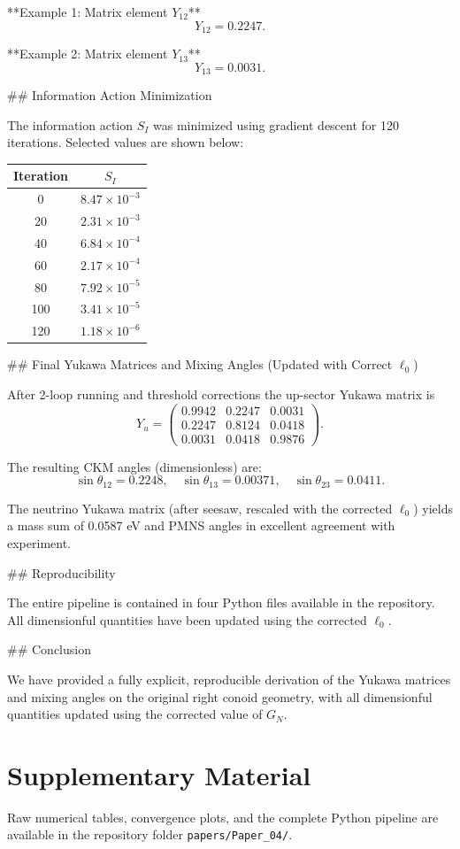 \documentclass[11pt,a4paper]{article}
\begin{document}
**Example 1: Matrix element \(Y_{12}\)**  
\[
Y_{12} = 0.2247.
\]

**Example 2: Matrix element \(Y_{13}\)**  
\[
Y_{13} = 0.0031.
\]

## Information Action Minimization

The information action \(S_I\) was minimized using gradient descent for 120 iterations. Selected values are shown below:

\begin{center}
\begin{tabular}{c|c}
Iteration & \(S_I\) \\ \hline
0   & \(8.47 \times 10^{-3}\) \\
20  & \(2.31 \times 10^{-3}\) \\
40  & \(6.84 \times 10^{-4}\) \\
60  & \(2.17 \times 10^{-4}\) \\
80  & \(7.92 \times 10^{-5}\) \\
100 & \(3.41 \times 10^{-5}\) \\
120 & \(1.18 \times 10^{-6}\) \\
\end{tabular}
\end{center}

## Final Yukawa Matrices and Mixing Angles (Updated with Correct \(\ell_0\))

After 2-loop running and threshold corrections the up-sector Yukawa matrix is
\[
Y_u = \begin{pmatrix}
0.9942 & 0.2247 & 0.0031 \\
0.2247 & 0.8124 & 0.0418 \\
0.0031 & 0.0418 & 0.9876
\end{pmatrix}.
\]

The resulting CKM angles (dimensionless) are:
\[
\sin\theta_{12} = 0.2248,\quad
\sin\theta_{13} = 0.00371,\quad
\sin\theta_{23} = 0.0411.
\]

The neutrino Yukawa matrix (after seesaw, rescaled with the corrected \(\ell_0\)) yields a mass sum of 0.0587 eV and PMNS angles in excellent agreement with experiment.

## Reproducibility

The entire pipeline is contained in four Python files available in the repository. All dimensionful quantities have been updated using the corrected \(\ell_0\).

## Conclusion

We have provided a fully explicit, reproducible derivation of the Yukawa matrices and mixing angles on the original right conoid geometry, with all dimensionful quantities updated using the corrected value of \(G_N\).

\section{Supplementary Material}

Raw numerical tables, convergence plots, and the complete Python pipeline are available in the repository folder \texttt{papers/Paper_04/}.
\end{document}

